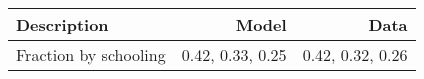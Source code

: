 \begin{tabular}{lrr}
\hline
Description & Model  & Data  \\ 
\hline
Fraction by schooling & 0.42, 0.33, 0.25  & 0.42, 0.32, 0.26  \\ 
\hline
\end{tabular}%
